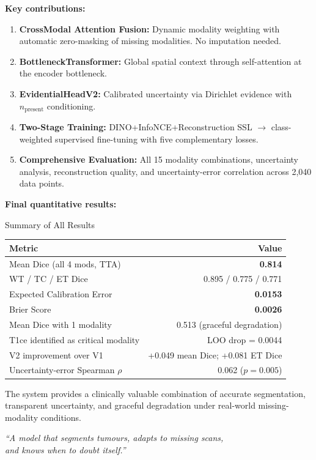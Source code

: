 \documentclass[12pt,a4paper]{article}
\begin{document}
\textbf{Key contributions:}
\begin{enumerate}[noitemsep]
  \item \textbf{CrossModal Attention Fusion:} Dynamic modality weighting with automatic zero-masking of missing modalities. No imputation needed.
  \item \textbf{BottleneckTransformer:} Global spatial context through self-attention at the encoder bottleneck.
  \item \textbf{EvidentialHeadV2:} Calibrated uncertainty via Dirichlet evidence with $n_{\text{present}}$ conditioning.
  \item \textbf{Two-Stage Training:} DINO+InfoNCE+Reconstruction SSL $\rightarrow$ class-weighted supervised fine-tuning with five complementary losses.
  \item \textbf{Comprehensive Evaluation:} All 15 modality combinations, uncertainty analysis, reconstruction quality, and uncertainty-error correlation across 2,040 data points.
\end{enumerate}

\textbf{Final quantitative results:}
\begin{resultbox}{Summary of All Results}
\begin{center}
\begin{tabular}{lr}
\toprule
\textbf{Metric} & \textbf{Value} \\
\midrule
Mean Dice (all 4 mods, TTA) & \textbf{0.814} \\
WT / TC / ET Dice & 0.895 / 0.775 / 0.771 \\
Expected Calibration Error & \textbf{0.0153} \\
Brier Score & \textbf{0.0026} \\
Mean Dice with 1 modality & 0.513 (graceful degradation) \\
T1ce identified as critical modality & LOO drop = 0.0044 \\
V2 improvement over V1 & +0.049 mean Dice; +0.081 ET Dice \\
Uncertainty-error Spearman $\rho$ & 0.062 ($p=0.005$) \\
\bottomrule
\end{tabular}
\end{center}
\end{resultbox}

The system provides a clinically valuable combination of accurate segmentation, transparent uncertainty, and graceful degradation under real-world missing-modality conditions.

\bigskip
\begin{center}
\large\itshape\color{mainblue}
``A model that segments tumours, adapts to missing scans,\\and knows when to doubt itself.''
\end{center}
\end{document}
